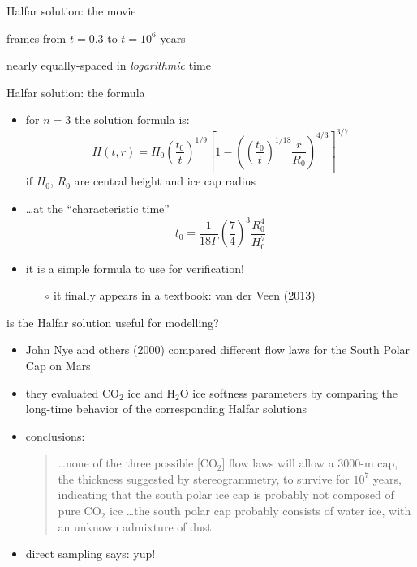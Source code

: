 \begin{frame}{Halfar solution: the movie}
\label{slide:plothalfar}

\medskip
\small
frames from $t=0.3$ to $t = 10^6$ years

\medskip
nearly equally-spaced in \emph{logarithmic} time

\begin{center}
\end{center}
\end{frame}


\begin{frame}{Halfar solution: the formula}

\begin{itemize}
\item for $n=3$ the solution formula is:
  $$H(t,r) = H_0 \left(\frac{t_0}{t}\right)^{1/9} \left[1 - \left(\left(\frac{t_0}{t}\right)^{1/18} \frac{r}{R_0}\right)^{4/3}\right]^{3/7}$$
if $H_0$, $R_0$ are central height and ice cap radius
\item \dots at the ``characteristic time''
  $$t_0 = \frac{1}{18 \Gamma} \left(\frac{7}{4}\right)^3 \frac{R_0^4}{H_0^{7}}$$
\item it is a simple formula to use for verification!
    \begin{itemize}
    \item[$\circ$] it finally appears in a textbook: van der Veen (2013)
    \end{itemize}
\end{itemize}
\end{frame}


\begin{frame}{is the Halfar solution useful for modelling?}

\begin{itemize}
\item John Nye and others (2000) compared different flow laws for the South Polar Cap on Mars
\item they evaluated $\text{CO}_2$ ice and $\text{H}_2\text{O}$ ice softness parameters by comparing the long-time behavior of the corresponding Halfar solutions
\item conclusions:
  \begin{quote}
  \dots none of the three possible [$\text{CO}_2$] flow laws will allow a 3000-m cap, the thickness suggested by stereogrammetry, to survive for $10^7$ years, indicating that the south polar ice cap is probably not composed of pure $\text{CO}_2$ ice \dots the south polar cap probably consists of water ice, with an unknown admixture of dust
  \end{quote}
\item direct sampling says: yup!
\end{itemize}

\end{frame}


